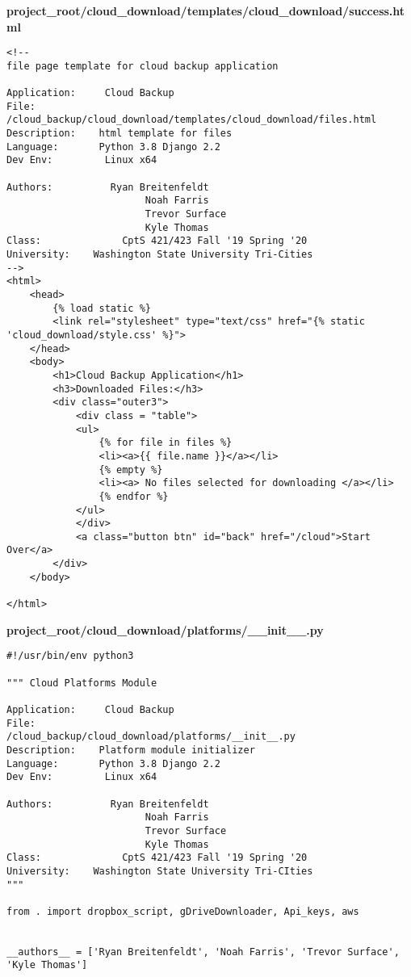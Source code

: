 \documentclass{article}
\begin{document}
\newpage
\textbf{project\_root/cloud\_download/templates/cloud\_download/success.html}
\begin{verbatim}
<!--
file page template for cloud backup application

Application:     Cloud Backup
File:                 /cloud_backup/cloud_download/templates/cloud_download/files.html
Description:    html template for files
Language:       Python 3.8 Django 2.2
Dev Env:         Linux x64

Authors:          Ryan Breitenfeldt
                        Noah Farris
                        Trevor Surface
                        Kyle Thomas
Class:              CptS 421/423 Fall '19 Spring '20
University:    Washington State University Tri-Cities
-->
<html>
    <head>
        {% load static %}
        <link rel="stylesheet" type="text/css" href="{% static 'cloud_download/style.css' %}">
    </head>
    <body>
        <h1>Cloud Backup Application</h1>
        <h3>Downloaded Files:</h3>
        <div class="outer3">
            <div class = "table">
            <ul>
                {% for file in files %}
                <li><a>{{ file.name }}</a></li>
                {% empty %}
                <li><a> No files selected for downloading </a></li>
                {% endfor %}
            </ul>
            </div>
            <a class="button btn" id="back" href="/cloud">Start Over</a>
        </div>
    </body>

</html>
\end{verbatim}


\newpage
\textbf{project\_root/cloud\_download/platforms/\_\_init\_\_.py}
\begin{verbatim}
#!/usr/bin/env python3

""" Cloud Platforms Module

Application:     Cloud Backup
File:                 /cloud_backup/cloud_download/platforms/__init__.py
Description:    Platform module initializer
Language:       Python 3.8 Django 2.2
Dev Env:         Linux x64

Authors:          Ryan Breitenfeldt
                        Noah Farris
                        Trevor Surface
                        Kyle Thomas
Class:              CptS 421/423 Fall '19 Spring '20
University:    Washington State University Tri-CIties
"""

from . import dropbox_script, gDriveDownloader, Api_keys, aws


__authors__ = ['Ryan Breitenfeldt', 'Noah Farris', 'Trevor Surface', 'Kyle Thomas']
\end{verbatim}
\end{document}
